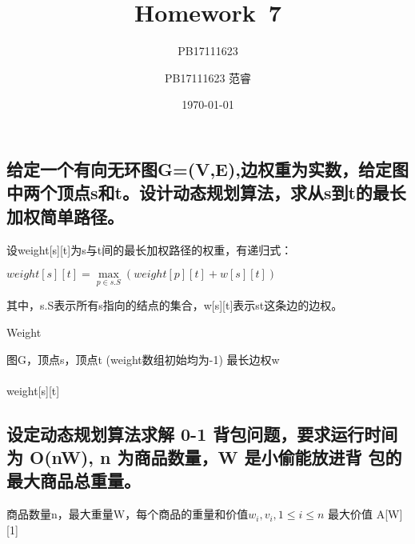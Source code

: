 \documentclass[UTF8]{ctexart}
\title{Homework\ 7}
\author{PB17111623}
\author{PB17111623 范睿}
\date{\today}
\begin{document}
\maketitle
\section{}
\subsection{给定一个有向无环图G=(V,E),边权重为实数，给定图中两个顶点s和t。设计动态规划算法，求从s到t的最长加权简单路径。}
设weight[s][t]为s与t间的最长加权路径的权重，有递归式：\\
\begin{center}
$weight[s][t]=\max\limits_{p\in s.S}(weight[p][t]+w[s][t])$
\end{center}
其中，s.S表示所有s指向的结点的集合，w[s][t]表示st这条边的边权。

\begin{algorithm}
	\caption{Weight}
	\begin{algorithmic}[1]%
	\Require 图G，顶点s，顶点t (weight数组初始均为-1)
	\Ensure 最长边权w
		\\
	\EndIf
				\EndIf
			\EndFor
		\EndFor
	\EndFor\\
	\Return weight[s][t]
	\end{algorithmic}
\end{algorithm}


\subsection{设定动态规划算法求解 0-1 背包问题，要求运行时间为 O(nW), n 为商品数量，W 是小偷能放进背
包的最大商品总重量。}

\begin{algorithm}
	\caption{}
	\begin{algorithmic}[1]%
	\Require 商品数量n，最大重量W，每个商品的重量和价值$w_i,v_i,1\le i\le n$
	\Ensure 最大价值
	\EndFor
			\Else
				\EndIf
			\EndIf
		\EndFor
	\EndFor
	\Return A[W][1]
	\end{algorithmic}
\end{algorithm}
\end{document}
